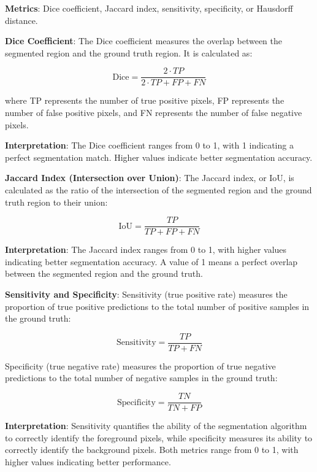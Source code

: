 \documentclass[]{report}
\begin{document}
\textbf{Metrics}: Dice coefficient, Jaccard index, sensitivity, specificity, or Hausdorff distance.\newline

\textbf{Dice Coefficient}:
The Dice coefficient measures the overlap between the segmented region and the ground truth region. It is calculated as:

\[ \text{Dice} = \frac{2 \cdot TP}{2 \cdot TP + FP + FN} \]

where TP represents the number of true positive pixels, FP represents the number of false positive pixels, and FN represents the number of false negative pixels.

\textbf{Interpretation}: The Dice coefficient ranges from 0 to 1, with 1 indicating a perfect segmentation match. Higher values indicate better segmentation accuracy.\newline\newline


\textbf{Jaccard Index (Intersection over Union)}:
The Jaccard index, or IoU, is calculated as the ratio of the intersection of the segmented region and the ground truth region to their union:

\[ \text{IoU} = \frac{TP}{TP + FP + FN} \]

\textbf{Interpretation}: The Jaccard index ranges from 0 to 1, with higher values indicating better segmentation accuracy. A value of 1 means a perfect overlap between the segmented region and the ground truth.\newline\newline

\textbf{Sensitivity and Specificity}:
Sensitivity (true positive rate) measures the proportion of true positive predictions to the total number of positive samples in the ground truth:

\[ \text{Sensitivity} = \frac{TP}{TP + FN} \]

Specificity (true negative rate) measures the proportion of true negative predictions to the total number of negative samples in the ground truth:

\[ \text{Specificity} = \frac{TN}{TN + FP} \]

\textbf{Interpretation}: Sensitivity quantifies the ability of the segmentation algorithm to correctly identify the foreground pixels, while specificity measures its ability to correctly identify the background pixels. Both metrics range from 0 to 1, with higher values indicating better performance.\newline\newline
\end{document}
